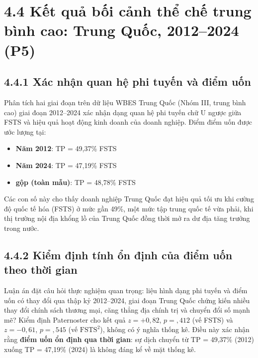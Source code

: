 \documentclass[
  a4paper,
  13pt]{extreport}
\providecommand{\tightlist}{%
  \setlength{\itemsep}{0pt}\setlength{\parskip}{0pt}}
\begin{document}
\hypertarget{kux1ebft-quux1ea3-bux1ed1i-cux1ea3nh-thux1ec3-chux1ebf-trung-buxecnh-cao-trung-quux1ed1c-20122024-p5}{%
\section{4.4 Kết quả bối cảnh thể chế trung bình cao: Trung Quốc,
2012--2024
(P5)}\label{kux1ebft-quux1ea3-bux1ed1i-cux1ea3nh-thux1ec3-chux1ebf-trung-buxecnh-cao-trung-quux1ed1c-20122024-p5}}

\hypertarget{xuxe1c-nhux1eadn-quan-hux1ec7-phi-tuyux1ebfn-vuxe0-ux111iux1ec3m-uux1ed1n}{%
\subsection{4.4.1 Xác nhận quan hệ phi tuyến và điểm
uốn}\label{xuxe1c-nhux1eadn-quan-hux1ec7-phi-tuyux1ebfn-vuxe0-ux111iux1ec3m-uux1ed1n}}

Phân tích hai giai đoạn trên dữ liệu WBES Trung Quốc (Nhóm III, trung
bình cao) giai đoạn 2012--2024 xác nhận dạng quan hệ phi tuyến chữ U
ngược giữa FSTS và hiệu quả hoạt động kinh doanh của doanh nghiệp. Điểm
điểm uốn được ước lượng tại:

\begin{itemize}
\tightlist
\item
  \textbf{Năm 2012}: TP = 49,37\% FSTS
\item
  \textbf{Năm 2024}: TP = 47,19\% FSTS
\item
  \textbf{gộp (toàn mẫu)}: TP = 48,78\% FSTS
\end{itemize}

Các con số này cho thấy doanh nghiệp Trung Quốc đạt hiệu quả tối ưu khi
cường độ quốc tế hóa (FSTS) ở mức gần 49\%, một mức tập trung quốc tế
vừa phải, khi thị trường nội địa khổng lồ của Trung Quốc đồng thời mở ra
dư địa tăng trưởng trong nước.

\hypertarget{kiux1ec3m-ux111ux1ecbnh-tuxednh-ux1ed5n-ux111ux1ecbnh-cux1ee7a-ux111iux1ec3m-uux1ed1n-theo-thux1eddi-gian}{%
\subsection{4.4.2 Kiểm định tính ổn định của điểm uốn theo thời
gian}\label{kiux1ec3m-ux111ux1ecbnh-tuxednh-ux1ed5n-ux111ux1ecbnh-cux1ee7a-ux111iux1ec3m-uux1ed1n-theo-thux1eddi-gian}}

Luận án đặt câu hỏi thực nghiệm quan trọng: liệu hình dạng phi tuyến và
điểm uốn có thay đổi qua thập kỷ 2012--2024, giai đoạn Trung Quốc chứng
kiến nhiều thay đổi chính sách thương mại, căng thẳng địa chính trị và
chuyển đổi số mạnh mẽ? Kiểm định Paternoster cho kết quả
\(z = +0{,}82\), \(p = {,}412\) (vế FSTS) và \(z = -0{,}61\),
\(p = {,}545\) (vế \(\text{FSTS}^2\)), không có ý nghĩa thống kê. Điều
này xác nhận rằng \textbf{điểm uốn ổn định qua thời gian}: sự dịch
chuyển từ TP = 49,37\% (2012) xuống TP = 47,19\% (2024) là không đáng kể
về mặt thống kê.
\end{document}
